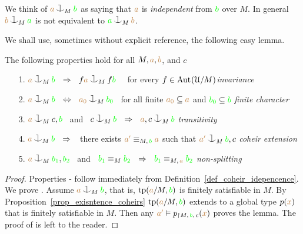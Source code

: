 \documentclass[creche.tex]{subfiles}
\begin{document}
We think of  ${\mr a}\cnonfork_M{\gr b}$ as saying that 
${\color{brown} a}$ is \emph{independent\/} from ${\color{green} b}$ over $M$.
%
%
In general %
${\mr b}\cnonfork_M{\gr a}$ is not 
equivalent to ${\gr a}\cnonfork_M{\mr b}$. 

We shall use, sometimes without explicit reference, the following easy lemma.

\begin{lemma}\label{lem_coheir_independence}
    The following properties hold for all $M,{\color{brown} a},{\color{brown} b}$, and $c$
    \begin{itemize}
    \item[1.] ${\mr a}\cnonfork_M{\gr b}\ \ \IMP\ \ f{\mr a}\cnonfork_Mf{\gr b}$ \ \ 
              for every $f\in{\rm Aut\kern.15ex}(\EuScript U/M)$\hfill \textit{invariance}
    \item[2.] ${\mr a}\cnonfork_M{\gr b}\ \ \IFF\ \ {\mr a_0}\cnonfork_M{\gr b_0}$
              \ for all finite ${\color{brown} a_0}\subseteq{\color{brown}a}$ and 
              ${\color{green} b_0}\subseteq{\color{green}b}$ \hfill\textit{finite character}
    \item[3.] ${\mr a}\cnonfork_Mc,{\gr b}$ \ and \ 
              $c\cnonfork_M{\gr b}\ \ \IMP\ \ {\mr a},c\cnonfork_M{\gr b}$
              \hfill\hfill\hfill\textit{transitivity}
    \item[4.] ${\mr a}\cnonfork_M{\gr b}\ \ \IMP\ \ $ 
              there exists ${\color{brown} a'}\equiv_{M,\,{\color{green} b}}{\color{brown} a}$ such that 
              ${\mr a'}\cnonfork_M{\gr b},c$
              \textit{coheir extension}
    \item[5.] ${\mr a}\cnonfork_M{\gr b_1},{\gr b_2}$ \ and \ 
    ${\color{green} b_1}\equiv_M{\color{green} b_2}\ \ \Rightarrow\ \ {\color{green} b_1}\equiv_{M,\,{\color{brown} a}}{\color{green} b_2}$
              \hspace{\stretch{20}}\textit{non-splitting}\QED
    \end{itemize}
    \end{lemma}
\begin{proof}

Properties - follow immediately from Definition~\ref{def_coheir_idepencence}.
We prove .
Assume ${\mr a}\cnonfork_M{\gr b}$, that is,  ${\rm tp}({\color{brown} a}/M,{\color{green} b})$ is finitely satisfiable in $M$. By Proposition~\ref{prop_exisntence_coheirs} ${\rm tp}({\color{brown} a}/M,{\color{green} b})$ extends to a global type $p({\color{brown} x})$ that is finitely satisfiable in $M$.
Then any ${\color{brown} a'}\vDash p_{\restriction M,\,{\color{green} b},\,c}({\color{brown} x})$ proves the lemma.
The proof of  is left to the reader.
\end{proof}
\end{document}
